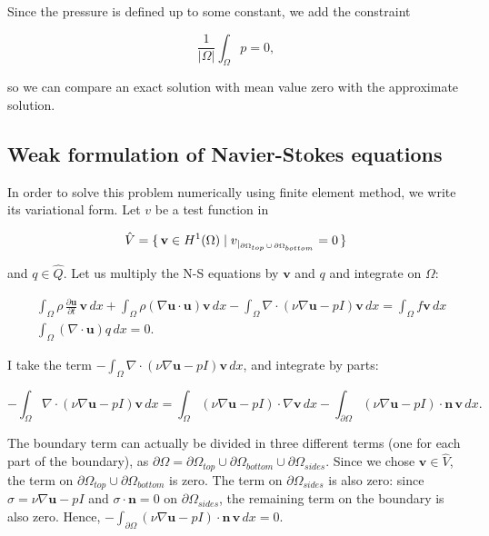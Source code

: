 \documentclass[11pt,a4paper,titlepage]{report}
\begin{document}
Since the pressure is defined up to some constant, we add the constraint

\[
\frac{1}{|\Omega |} \int_{\Omega} p = 0,
\]

so we can compare an exact solution with mean value zero with the approximate solution.

\subsection{Weak formulation of Navier-Stokes equations}


In order to solve this problem numerically using finite element method, we write its variational form. Let $v$ be a test function in

\[
\hat{V} = \set{\mathbf{v} \in H^1(\Omega) | v_{|_{\partial \Omega_{top} \, \cup \, \partial \Omega_{bottom}}} = 0}
\]

and $q \in \hat{Q}$. Let us multiply the N-S equations by $\mathbf{v}$ and $q$ and integrate on $\Omega$:

\begin{align}
&\int_{\Omega} \rho \, \frac{\partial \mathbf{u}} {\partial t} \, \mathbf{v} \, dx + \int_{\Omega} \rho (\nabla \mathbf{u} \cdot \mathbf{u} )\mathbf{v} \, dx - \int_{\Omega} \nabla \cdot (\nu \nabla \mathbf{u} - pI)\mathbf{v} \, dx = \int_{\Omega} f\mathbf{v} \, dx \\
&\int_{\Omega} (\nabla \cdot \mathbf{u}) q \, dx = 0.
\end{align}

I take the term $- \int_{\Omega} \nabla \cdot (\nu \nabla \mathbf{u} - pI)\mathbf{v} \, dx$, and integrate by parts:

\[
- \int_{\Omega} \nabla \cdot (\nu \nabla \mathbf{u} - pI)\mathbf{v} \, dx = \int_{\Omega} (\nu \nabla \mathbf{u} - pI) \cdot \nabla \mathbf{v} \, dx - \int_{\partial \Omega} (\nu \nabla \mathbf{u} - pI) \cdot \mathbf{n} \, \mathbf{v} \, dx.
\]

The boundary term can actually be divided in three different terms (one for each part of the boundary), as $\partial \Omega = \partial \Omega_{top} \cup \partial \Omega_{bottom} \cup \partial \Omega_{sides}$. Since we chose $\mathbf{v} \in \hat{V}$, the term on $\partial \Omega_{top} \cup \partial \Omega_{bottom}$ is zero. The term on $\partial \Omega_{sides}$ is also zero: since $\sigma = \nu \nabla \mathbf{u} - pI$ and $\sigma \cdot \mathbf{n} = 0$ on $\partial \Omega_{sides}$, the remaining term on the boundary is also zero. Hence, $- \int_{\partial \Omega} (\nu \nabla \mathbf{u} - pI) \cdot \mathbf{n} \, \mathbf{v} \, dx = 0$.
\end{document}
